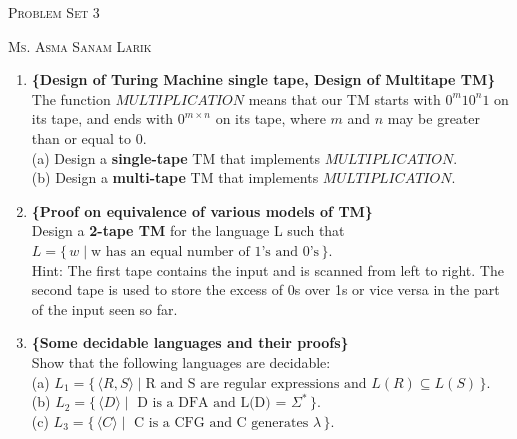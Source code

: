 \documentclass[11pt, article, oneside]{memoir}
\newcommand{\set}[1]{\{\, #1\, \}}
\begin{document}
\begin{center}
\LARGE{\textsc{Problem Set 3}}
 
\large{\textsc{Ms. Asma Sanam Larik}}
\end{center}


\begin{enumerate}
    \item
    \textbf{\{Design of Turing Machine single tape, Design of Multitape TM\}}
    \\The function \(MULTIPLICATION\) means that our TM starts with \(0^m10^n1\) on its tape, and ends with \(0^{m \times n}\) on its tape, where \(m\) and \(n\) may be greater than or equal to 0.
    \\(a) Design a \textbf{single-tape} TM that implements \(MULTIPLICATION\).
    \\(b) Design a \textbf{multi-tape} TM that implements \(MULTIPLICATION\).
   

    \item
    \textbf{\{Proof on equivalence of various models of TM\}}
    \\Design a \textbf{2-tape TM} for the language L such that \(L = \set{w \mid \text{w has an equal number of 1's and 0's}}\).
    \\Hint: The first tape contains the input and is scanned from left to right. The second tape is used to store the excess of 0s over 1s or vice versa in the part of the input seen so far.

    \item
    \textbf{\{Some decidable languages and their proofs\}}
    \\Show that the following languages are decidable:
    \\(a) \(L_1 = \set{\langle R, S\rangle \mid \text{R and S are regular expressions and }L(R) \subseteq L(S)}\).
    \\(b) \(L_2 = \set{\langle D\rangle \mid \text{ D is a DFA and L(D) = }\Sigma^*}\).
    \\(c) \(L_3 = \set{\langle C\rangle \mid \text{ C is a CFG and C generates }\lambda}\).


\end{enumerate}
\end{document}
